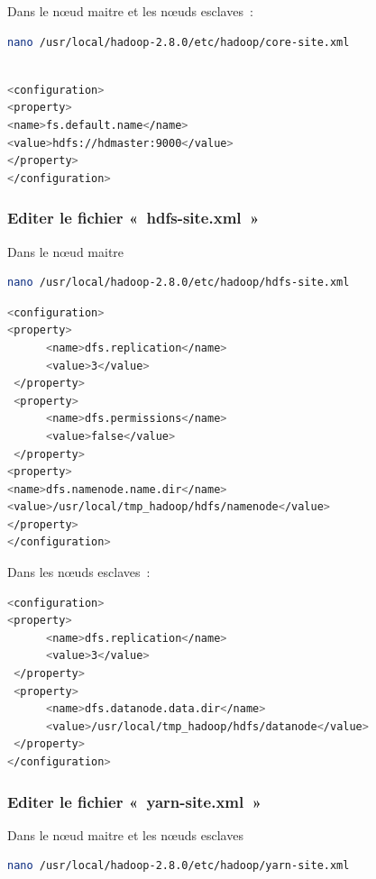 \documentclass[12pt,french]{book}
\begin{document}
Dans le nœud maitre et les nœuds esclaves :


\begin{lstlisting}[language=bash, frame=single]
nano /usr/local/hadoop-2.8.0/etc/hadoop/core-site.xml
\end{lstlisting}

\begin{lstlisting}[language=bash, frame=single]

<configuration>
<property>
<name>fs.default.name</name>
<value>hdfs://hdmaster:9000</value>
</property>
</configuration>

\end{lstlisting}

\subsubsection{Editer le fichier « hdfs-site.xml »}

Dans le nœud maitre

\begin{lstlisting}[language=bash, frame=single]
nano /usr/local/hadoop-2.8.0/etc/hadoop/hdfs-site.xml 
\end{lstlisting}

\begin{lstlisting}[language=bash, frame=single]
<configuration>
<property>
      <name>dfs.replication</name>
      <value>3</value>
 </property>
 <property>
      <name>dfs.permissions</name>
      <value>false</value>
 </property>
<property>
<name>dfs.namenode.name.dir</name>
<value>/usr/local/tmp_hadoop/hdfs/namenode</value>
</property>
</configuration>
\end{lstlisting}

Dans les nœuds esclaves :

\begin{lstlisting}[language=bash, frame=single]
<configuration>
<property>
      <name>dfs.replication</name>
      <value>3</value>
 </property>
 <property>
      <name>dfs.datanode.data.dir</name>
      <value>/usr/local/tmp_hadoop/hdfs/datanode</value>
 </property>
</configuration> 
\end{lstlisting}

\subsubsection{Editer le fichier « yarn-site.xml »}

Dans le nœud maitre et les nœuds esclaves


\begin{lstlisting}[language=bash, frame=single]
nano /usr/local/hadoop-2.8.0/etc/hadoop/yarn-site.xml 
\end{lstlisting}
\end{document}
